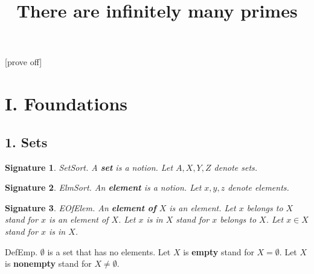 \newtheorem{signature}{Signature}
\newtheorem{axiom}{Axiom}
\newtheorem{signaturep}{Signature}
\newtheorem{axiomp}{Axiom}
\newtheorem{definitionp}{Definition}
\newtheorem{theoremp}{Theorem}
\newtheorem{lemmap}{Lemma}
 
\newcommand{\power}{{\cal P}} 
\newcommand{\preimg}[2]{{#1}^{-1}[#2]} 
\newcommand{\Seq}[2]{\{#1,\dots,#2\}}
\newcommand{\Set}[3]{\{#1_{#2},\dots,#1_{#3}\}}
\newcommand{\Product}[3]{\prod_{i=#2}^{#3}{#1}_i}
\newcommand{\subfunc}[2]{{#1}_{#2}}
\newcommand{\CC}{{\Bbb C}}
\newcommand{\RR}{{\Bbb R}}
\newcommand{\QQ}{{\Bbb Q}}
\newcommand{\ZZ}{{\Bbb Z}} 
\newcommand{\NN}{{\Bbb N}}
\newcommand{\NNplus}{{\Bbb N}^+}

[prove off]

\title{There are infinitely many primes}
\maketitle
\section{I. Foundations}

\subsection{1. Sets}


\begin{signature} SetSort.  A {\bf set} is a notion.
Let $A,X,Y,Z$ denote sets.
\end{signature}

\begin{signature} ElmSort.  
An {\bf element} is a notion.
Let $x,y,z$ denote elements.
\end{signature}

\begin{signature} EOfElem.  
An {\bf element of} $X$ is an element.
Let $x$ belongs to $X$ stand for $x$ is an element of $X$.
Let $x$ is in $X$ stand for $x$ belongs to $X$.
Let $x \in X$ stand for $x$ is in $X$.
\end{signature}

\begin{definition} DefEmp.
$\emptyset$ is a set that has no elements.
Let $X$ is {\bf empty} stand for $X = \emptyset$.
Let $X$ is {\bf nonempty} stand for $X \neq \emptyset$.
\end{definition}

